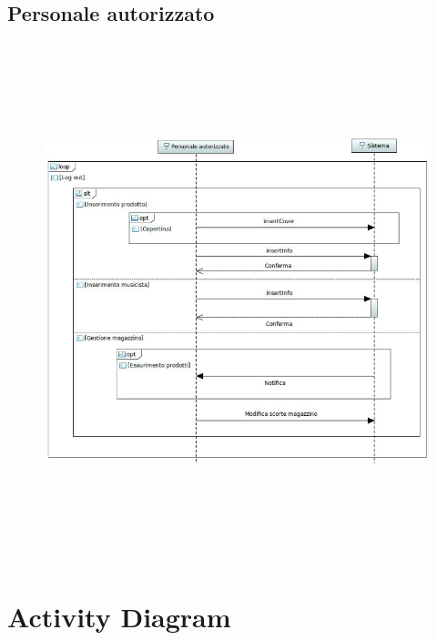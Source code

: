 \documentclass[a4paper,12pt]{report}
\begin{document}
	\section*{Personale autorizzato}
	\begin{figure}[h]
		\centering
		\includegraphics[width=\textwidth, height=15cm]{Sequence_Gestore}
	\end{figure}



	\chapter*{Activity Diagram}
\end{document}
